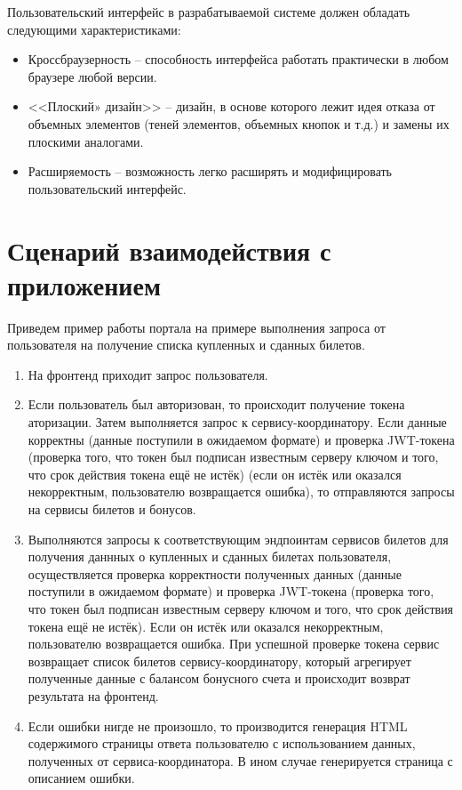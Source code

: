 Пользовательский интерфейс в разрабатываемой системе должен обладать следующими характеристиками:
\begin{itemize}
  \item Кроссбраузерность -- способность интерфейса работать практически в любом браузере любой версии. 
  \item <<Плоский» дизайн>> -- дизайн, в основе которого лежит идея отказа от объемных элементов (теней элементов, объемных кнопок и т.д.) и замены их плоскими аналогами.
  \item Расширяемость -- возможность легко расширять и модифицировать пользовательский интерфейс.
\end{itemize}
  
  
\section{Сценарий взаимодействия с приложением}
Приведем пример работы портала на примере выполнения запроса от пользователя на получение списка купленных и сданных билетов.

\begin{enumerate}
  \item На фронтенд приходит запрос пользователя.
  \item Если пользователь был авторизован, то происходит получение токена аторизации. Затем выполняется запрос к сервису-координатору. Если данные корректны (данные поступили в ожидаемом формате) и проверка JWT-токена (проверка того, что токен был подписан известным серверу ключом и того, что срок действия токена ещё не истёк) (если он истёк или оказался некорректным, пользователю возвращается ошибка), то отправляются запросы на сервисы билетов и бонусов. 
  \item Выполняются запросы к соответствующим эндпоинтам сервисов билетов для получения даннных о купленных и сданных билетах пользователя, осуществляется проверка корректности полученных данных (данные поступили в ожидаемом формате) и проверка JWT-токена (проверка того, что токен был подписан известным серверу ключом и того, что срок действия токена ещё не истёк). Если он истёк или оказался некорректным, пользователю возвращается ошибка. При успешной проверке токена сервис возвращает список билетов сервису-координатору, который агрегирует полученные данные с балансом бонусного счета и происходит возврат результата на фронтенд.
  \item Если ошибки нигде не произошло, то производится генерация HTML содержимого страницы ответа пользователю с использованием данных, полученных от сервиса-координатора. В ином случае генерируется страница с описанием ошибки.
\end{enumerate}
